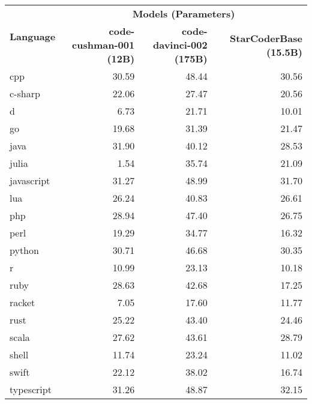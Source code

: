 \begin{tabular}{lrrr}
\toprule
\multirow{2}{*}{\textbf{Language}}          & \multicolumn{3}{c}{\textbf{Models (Parameters)}} \\\cmidrule{2-4}
&  \textbf{code-cushman-001 (12B)} &  \textbf{code-davinci-002 (175B)} &  \textbf{StarCoderBase (15.5B)} \\
\midrule
     cpp &             30.59 &             48.44 &      30.56 \\
      c-sharp &             22.06 &             27.47 &      20.56 \\
       d &              6.73 &             21.71 &      10.01 \\
      go &             19.68 &             31.39 &      21.47 \\
    java &             31.90 &             40.12 &      28.53 \\
      julia &              1.54 &             35.74 &      21.09 \\
      javascript &             31.27 &             48.99 &      31.70 \\
     lua &             26.24 &             40.83 &      26.61 \\
     php &             28.94 &             47.40 &      26.75 \\
      perl &             19.29 &             34.77 &      16.32 \\
      python &             30.71 &             46.68 &      30.35 \\
       r &             10.99 &             23.13 &      10.18 \\
      ruby &             28.63 &             42.68 &      17.25 \\
     racket &              7.05 &             17.60 &      11.77 \\
      rust &             25.22 &             43.40 &      24.46 \\
   scala &             27.62 &             43.61 &      28.79 \\
      shell &             11.74 &             23.24 &      11.02 \\
   swift &             22.12 &             38.02 &      16.74 \\
      typescript &             31.26 &             48.87 &      32.15 \\
\bottomrule
\end{tabular}
